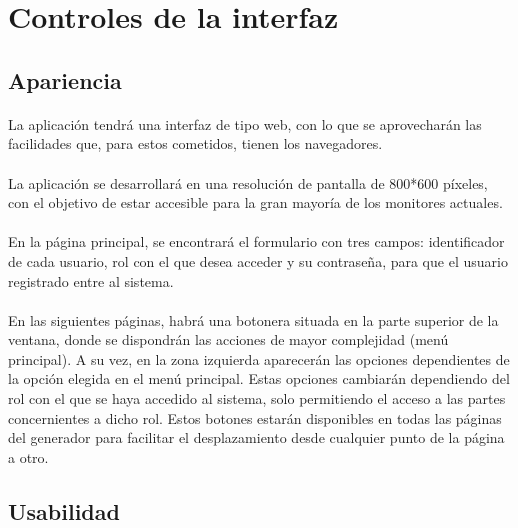 \section{Controles de la interfaz}

  \subsection{Apariencia}

  \paragraph{}La aplicación tendrá una interfaz de tipo web, con lo que se
  aprovecharán las facilidades que, para estos cometidos, tienen los
  navegadores.

  \paragraph{}La aplicación se desarrollará en una resolución de pantalla de
  800*600 píxeles, con el objetivo de estar accesible para la gran mayoría de
  los monitores actuales.

  \paragraph{}En la página principal, se encontrará el formulario con tres
  campos: identificador de cada usuario, rol con el que desea acceder y
  su contraseña, para que el usuario registrado entre al sistema.

  \paragraph{}En las siguientes páginas, habrá una botonera situada en la parte
  superior de la ventana, donde se dispondrán las acciones de mayor complejidad
  (menú principal). A su vez, en la zona izquierda aparecerán las opciones
  dependientes de la opción elegida en el menú principal. Estas opciones
  cambiarán dependiendo del rol con el que se haya accedido al sistema, solo
  permitiendo el acceso a las partes concernientes a dicho rol. Estos botones
  estarán disponibles en todas las páginas del generador para facilitar el
  desplazamiento desde cualquier punto de la página a otro.

  \subsection{Usabilidad}


